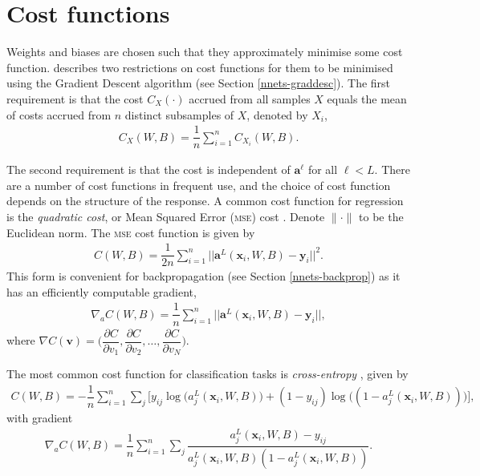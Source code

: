 \section{Cost functions}\label{nnets-cost}

Weights and biases are chosen such that they approximately minimise some cost function. \cite{Nielson2015} describes two restrictions on cost functions for them to be minimised using the Gradient Descent algorithm (see Section \ref{nnets-graddesc}). The first requirement is that the cost $C_X(\cdot)$ accrued from all samples $X$ equals the mean of costs accrued from $n$ distinct subsamples of $X$, denoted by $X_i$,
\begin{align}
	C_X(W, B) = \dfrac{1}{n}\sum_{i=1}^n C_{X_i}(W,B).
\end{align}

The second requirement is that the cost is independent of $\mathbf{a}^\ell$ for all $\ell < L$. There are a number of cost functions in frequent use, and the choice of cost function depends on the structure of the response. A common cost function for regression is the \textit{quadratic cost}, or Mean Squared Error (\textsc{mse}) cost \citep{Nielson2015}. Denote $\|\cdot\|$ to be the Euclidean norm. The \textsc{mse} cost function is given by
\begin{align}
	C(W,B) = \dfrac{1}{2n}\sum_{i=1}^n||\mathbf{a}^L(\mathbf{x}_i,W,B) - \mathbf{y}_i ||^2.
\end{align}
This form is convenient for backpropagation (see Section \ref{nnets-backprop}) as it has an efficiently computable gradient,
\begin{align}
	\nabla_aC(W,B) = \dfrac{1}{n}\sum_{i=1}^n||\mathbf{a}^L(\mathbf{x}_i,W,B) - \mathbf{y}_i ||,
\end{align}
where $\nabla C(\mathbf{v}) = \Big(\dfrac{\partial C}{\partial v_1}, \dfrac{\partial C}{\partial v_2},\ldots, \dfrac{\partial C}{\partial v_N}\Big)$.

The most common cost function for classification tasks is \textit{cross-entropy} \citep{Nielson2015}, given by
\begin{align}\label{nnets-cross-entropy-eq}
	C(W,B) = -\dfrac{1}{n}\sum_{i=1}^n\sum_j\big[y_{ij}\log\big(a_j^L(\mathbf{x}_i,W,B)\big) + (1 - y_{ij})\log\big( (1 - a_j^L(\mathbf{x}_i,W,B))\big)\big],
\end{align}
with gradient
\begin{align}
	\nabla_aC(W,B) = \dfrac{1}{n}\sum_{i=1}^n\sum_j\dfrac{a_j^L(\mathbf{x}_i,W,B) - y_{ij}}{a_j^L(\mathbf{x}_i,W,B)(1-a_j^L(\mathbf{x}_i,W,B))}.
\end{align}

